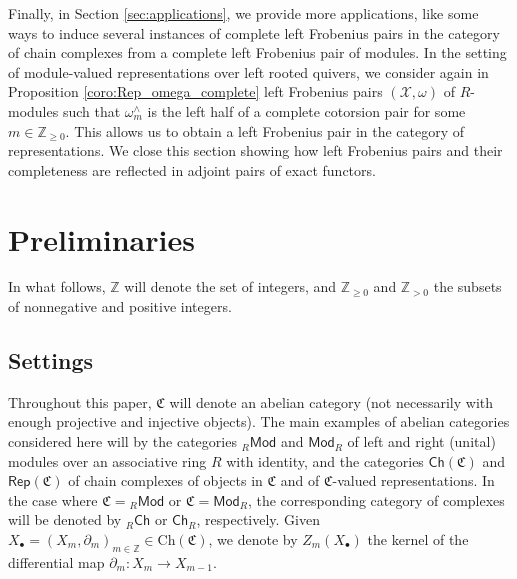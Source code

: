\documentclass[10pt,reqno]{amsart}
\numberwithin{equation}{section}
\theoremstyle{remark}
\newcommand{\X}{\mathcal{X}}
\newcommand{\Ch}{\mathrm{Ch}}
\begin{document}

Finally, in Section \ref{sec:applications}, we provide more applications, like some ways to induce several instances of complete left Frobenius pairs in the category of chain complexes from a complete left Frobenius pair of modules. In the setting of module-valued representations over left rooted quivers, we consider again in Proposition \ref{coro:Rep_omega_complete} left Frobenius pairs $(\X,\omega)$ of $R$-modules such that $\omega^\wedge_m$ is the left half of a complete cotorsion pair for some $m \in \mathbb{Z}_{\geq 0}$. This allows us to obtain a left Frobenius pair in the category of representations. We close this section showing how left Frobenius pairs and their completeness are reflected in adjoint pairs of exact functors. 



\section{Preliminaries} \label{sec:prelims}

In what follows, $\mathbb{Z}$ will denote the set of integers, and $\mathbb{Z}_{\geq 0}$ and $\mathbb{Z}_{> 0}$ the subsets of nonnegative and positive integers. 

\subsection*{Settings}

Throughout this paper, $\mathfrak{C}$ will denote an abelian category (not necessarily with enough projective and injective objects). The main examples of abelian categories considered here will by the categories ${}_R\mathsf{Mod}$ and $\mathsf{Mod}_R$ of left and right (unital) modules over an associative ring $R$ with identity, and the categories $\mathsf{Ch}(\mathfrak{C})$ and $\mathsf{Rep}(\mathfrak{C})$ of chain complexes of objects in $\mathfrak{C}$ and of $\mathfrak{C}$-valued representations. In the case where $\mathfrak{C} = {}_R\mathsf{Mod}$ or $\mathfrak{C} = \mathsf{Mod}_R$, the corresponding category of complexes will be denoted by ${}_R\mathsf{Ch}$ or $\mathsf{Ch}_R$, respectively. Given $X_\bullet = (X_m,\partial_m)_{m \in \mathbb{Z}} \in \Ch(\mathfrak{C})$, we denote by $Z_m(X_\bullet)$ the kernel of the differential map $\partial_m \colon X_m \to X_{m-1}$.  
 
\end{document}
